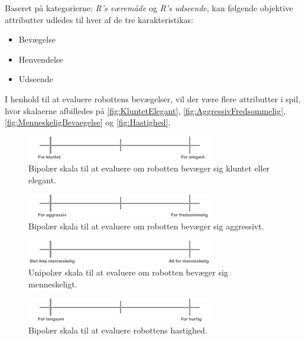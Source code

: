 Baseret på kategorierne: \textit{R's væremåde} og \textit{R's udseende}, kan følgende objektive attributter udledes til hver af de tre karakteristikas: \blankline
%
\begin{itemize}
  \item Bevægelse
  \item Henvendelse
  \item Udseende\blankline
\end{itemize}
%
I henhold til at evaluere robottens bevægelser, vil der være flere attributter i spil, hvor skalaerne afbilledes på \autoref{fig:KluntetElegant}, \autoref{fig:AggressivFredsommelig}, \autoref{fig:MenneskeligBevaegelse} og \autoref{fig:Hastighed}.
%
\begin{figure}[H]
\centering
\includegraphics[width =\textwidth]{Figure/KluntetElegant} 
\caption{Bipolær skala til at evaluere om robotten bevæger sig kluntet eller elegant.}
\label{fig:KluntetElegant}
\end{figure}
\noindent
%
%
\begin{figure}[H]
\centering
\includegraphics[width =\textwidth]{Figure/AggressivFredsommelig} 
\caption{Bipolær skala til at evaluere om robotten bevæger sig aggressivt.}
\label{fig:AggressivFredsommelig}
\end{figure}
\noindent
%
%
\begin{figure}[H]
\centering
\includegraphics[width =\textwidth]{Figure/Menneskelig} 
\caption{Unipolær skala til at evaluere om robotten bevæger sig menneskeligt.}
\label{fig:MenneskeligBevaegelse}
\end{figure}
\noindent
%
%
\begin{figure}[H]
\centering
\includegraphics[width =\textwidth]{Figure/Hastighed} 
\caption{Bipolær skala til at evaluere robottens hastighed.}
\label{fig:Hastighed}
\end{figure}
